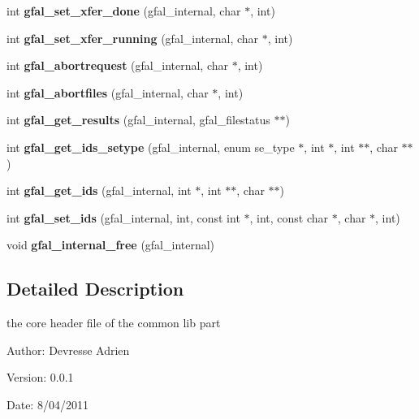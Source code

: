 \begin{CompactItemize}
\item 
int \textbf{gfal\_\-set\_\-xfer\_\-done} (gfal\_\-internal, char $\ast$, int)\label{gfal__common_8h_906f9ae2d627df81007ce2ac8b9c3077}

\item 
int \textbf{gfal\_\-set\_\-xfer\_\-running} (gfal\_\-internal, char $\ast$, int)\label{gfal__common_8h_b45892d9b11438b075a1337ce785d336}

\item 
int \textbf{gfal\_\-abortrequest} (gfal\_\-internal, char $\ast$, int)\label{gfal__common_8h_36d39f2c8275e09815a156177b7f2b91}

\item 
int \textbf{gfal\_\-abortfiles} (gfal\_\-internal, char $\ast$, int)\label{gfal__common_8h_895e99946a94b412cb16542e49c50d2e}

\item 
int \textbf{gfal\_\-get\_\-results} (gfal\_\-internal, gfal\_\-filestatus $\ast$$\ast$)\label{gfal__common_8h_516faa64e8163a2fd3aeabb23c81261d}

\item 
int \textbf{gfal\_\-get\_\-ids\_\-setype} (gfal\_\-internal, enum se\_\-type $\ast$, int $\ast$, int $\ast$$\ast$, char $\ast$$\ast$)\label{gfal__common_8h_d3480ef06395ae3e11bbcc7b4f6f947e}

\item 
int \textbf{gfal\_\-get\_\-ids} (gfal\_\-internal, int $\ast$, int $\ast$$\ast$, char $\ast$$\ast$)\label{gfal__common_8h_53ad87ee70e3be3542a13e3f0d4e4f13}

\item 
int \textbf{gfal\_\-set\_\-ids} (gfal\_\-internal, int, const int $\ast$, int, const char $\ast$, char $\ast$, int)\label{gfal__common_8h_24e63e5dbd1e49352f7af0a67b14a9fc}

\item 
void \textbf{gfal\_\-internal\_\-free} (gfal\_\-internal)\label{gfal__common_8h_e79632687935a7c4a7d0580aaa15dd88}

\end{CompactItemize}


\subsection{Detailed Description}
the core header file of the common lib part 

\begin{Desc}
\item[Author:]Devresse Adrien \end{Desc}
\begin{Desc}
\item[Version:]0.0.1 \end{Desc}
\begin{Desc}
\item[Date:]8/04/2011 \end{Desc}
